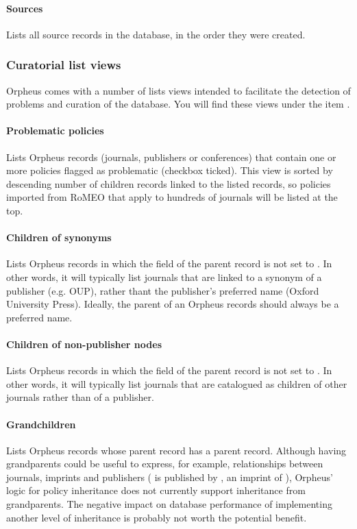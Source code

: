 \documentclass[british, 12pt]{article}
\begin{document}
\paragraph{Sources} Lists all source records in the database, in the order they were created.

\subsubsection{Curatorial list views}

Orpheus comes with a number of lists views intended to facilitate the detection of problems and curation of the database. You will find these views under the  item .

\paragraph{Problematic policies} Lists Orpheus records (journals, publishers or conferences) that contain one or more policies flagged as problematic (checkbox  ticked). This view is sorted by descending number of children records linked to the listed records, so policies imported from RoMEO that apply to hundreds of journals will be listed at the top.

\paragraph{Children of synonyms} Lists Orpheus records in which the   field of the parent record is not set to . In other words,  it will typically list journals that are linked to a synonym of a publisher (e.g. OUP), rather thant the publisher's preferred name (Oxford University Press). Ideally, the parent of an Orpheus records should always be a preferred name.

\paragraph{Children of non-publisher nodes} Lists Orpheus records in which the   field of the parent record is not set to . In other words,  it will typically list journals that are catalogued as children of other journals rather than of a publisher.

\paragraph{Grandchildren} Lists Orpheus records whose parent record has a parent record. Although having grandparents could be useful to express, for example, relationships between journals, imprints and publishers ( is published by , an imprint of ), Orpheus' logic for policy inheritance does not currently support inheritance from grandparents. The negative impact on database performance of implementing another level of inheritance is probably not worth the potential benefit.
\end{document}
